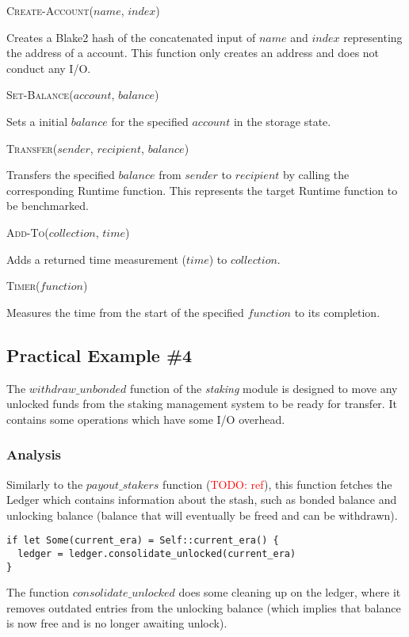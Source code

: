 \documentclass[11pt,a4paper]{article}
\newcommand{\todo}[1]{\textcolor{red}{TODO: #1}}
\newcommand{\SubItem}[1]{
    {\setlength\itemindent{15pt} \item[-] #1}
}
\begin{document}
\begin{itemize}
  \item \textsc{Create-Account($name$, $index$)} \SubItem{Creates a Blake2 hash
      of the concatenated input of $name$ and $index$ representing the address
      of a account. This function only creates an address and does not conduct
      any I/O.}
  \item \textsc{Set-Balance($account$, $balance$)} \SubItem{Sets a initial
      $balance$ for the specified $account$ in the storage state.}
  \item \textsc{Transfer($sender$, $recipient$, $balance$)} \SubItem{Transfers
      the specified $balance$ from $sender$ to $recipient$ by calling the
      corresponding Runtime function. This represents the target Runtime
      function to be benchmarked.}
  \item \textsc{Add-To($collection$, $time$)} \SubItem{Adds a returned time
      measurement ($time$) to $collection$.}
  \item \textsc{Timer($function$)} \SubItem{Measures the time from the start of
      the specified $function$ to its completion.}
\end{itemize}

\subsection{Practical Example \#4}

The $withdraw\_unbonded$ function of the \textit{staking} module is designed to
move any unlocked funds from the staking management system to be ready for
transfer. It contains some operations which have some I/O overhead.

\subsubsection{Analysis}

Similarly to the $payout\_stakers$ function (\todo{ref}), this function fetches
the Ledger which contains information about the stash, such as bonded balance
and unlocking balance (balance that will eventually be freed and can be
withdrawn).

\begin{verbatim}
if let Some(current_era) = Self::current_era() {
  ledger = ledger.consolidate_unlocked(current_era)
}
\end{verbatim}

The function $consolidate\_unlocked$ does some cleaning up on the ledger, where
it removes outdated entries from the unlocking balance (which implies that
balance is now free and is no longer awaiting unlock).
\end{document}
